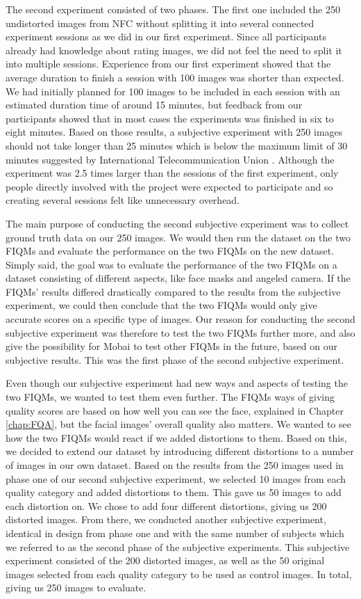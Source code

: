 The second experiment consisted of two phases. The first one included the 250 undistorted images from NFC without splitting it into several connected experiment sessions as we did in our first experiment. Since all participants already had knowledge about rating images, we did not feel the need to split it into multiple sessions. Experience from our first experiment showed that the average duration to finish a session with 100 images was shorter than expected. We had initially planned for 100 images to be included in each session with an estimated duration time of around 15 minutes, but feedback from our participants showed that in most cases the experiments was finished in six to eight minutes. Based on those results, a subjective experiment with 250 images should not take longer than 25 minutes which is below the maximum limit of 30 minutes suggested by International Telecommunication Union \cite{methodologySubjective}. Although the experiment was 2.5 times larger than the sessions of the first experiment, only people directly involved with the project were expected to participate and so creating several sessions felt like unnecessary overhead. 

The main purpose of conducting the second subjective experiment was to collect ground truth data on our 250 images. We would then run the dataset on the two FIQMs and evaluate the performance on the two FIQMs on the new dataset. Simply said, the goal was to evaluate the performance of the two FIQMs on a dataset consisting of different aspects, like face masks and angeled camera. If the FIQMs' results differed drastically compared to the results from the subjective experiment, we could then conclude that the two FIQMs would only give accurate scores on a specific type of images. Our reason for conducting the second subjective experiment was therefore to test the two FIQMs further more, and also give the possibility for Mobai to test other FIQMs in the future, based on our subjective results. This was the first phase of the second subjective experiment.

Even though our subjective experiment had new ways and aspects of testing the two FIQMs, we wanted to test them even further. The FIQMs ways of giving quality scores are based on how well you can see the face, explained in Chapter \ref{chap:FQA}, but the facial images' overall quality also matters. We wanted to see how the two FIQMs would react if we added distortions to them. Based on this, we decided to extend our dataset by introducing different distortions to a number of images in our own dataset. Based on the results from the 250 images used in phase one of our second subjective experiment, we selected 10 images from each quality category and added distortions to them. This gave us 50 images to add each distortion on. We chose to add four different distortions, giving us 200 distorted images. From there, we conducted another subjective experiment, identical in design from phase one and with the same number of subjects which we referred to as the second phase of the subjective experiments. This subjective experiment consisted of the 200 distorted images, as well as the 50 original images selected from each quality category to be used as control images. In total, giving us 250 images to evaluate.

